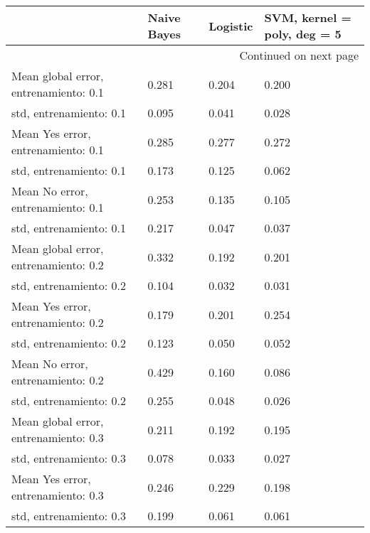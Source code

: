 \begin{longtable}{p{4cm}|p{1.5cm}|p{1.5cm}|p{1.5cm}}
\toprule
{} &  Naive Bayes &  Logistic &  SVM, kernel = poly, deg = 5 \\
\midrule
\endhead
\midrule
\multicolumn{4}{r}{{Continued on next page}} \\
\midrule
\endfoot

\bottomrule
\endlastfoot
Mean global error, entrenamiento: 0.1 &        0.281 &     0.204 &                        0.200 \\
std, entrenamiento: 0.1               &        0.095 &     0.041 &                        0.028 \\
Mean Yes error, entrenamiento: 0.1    &        0.285 &     0.277 &                        0.272 \\
std, entrenamiento: 0.1               &        0.173 &     0.125 &                        0.062 \\
Mean No error, entrenamiento: 0.1     &        0.253 &     0.135 &                        0.105 \\
std, entrenamiento: 0.1               &        0.217 &     0.047 &                        0.037 \\
Mean global error, entrenamiento: 0.2 &        0.332 &     0.192 &                        0.201 \\
std, entrenamiento: 0.2               &        0.104 &     0.032 &                        0.031 \\
Mean Yes error, entrenamiento: 0.2    &        0.179 &     0.201 &                        0.254 \\
std, entrenamiento: 0.2               &        0.123 &     0.050 &                        0.052 \\
Mean No error, entrenamiento: 0.2     &        0.429 &     0.160 &                        0.086 \\
std, entrenamiento: 0.2               &        0.255 &     0.048 &                        0.026 \\
Mean global error, entrenamiento: 0.3 &        0.211 &     0.192 &                        0.195 \\
std, entrenamiento: 0.3               &        0.078 &     0.033 &                        0.027 \\
Mean Yes error, entrenamiento: 0.3    &        0.246 &     0.229 &                        0.198 \\
std, entrenamiento: 0.3               &        0.199 &     0.061 &                        0.061 \\

\end{longtable}
